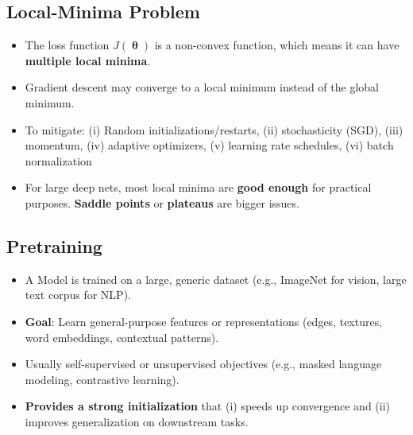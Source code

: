 \subsection*{Local-Minima Problem}
\begin{itemize}
  \item The loss function $J(\boldsymbol{\uptheta})$ is a non-convex function, which means it can have \textbf{multiple local minima}.
  \item Gradient descent may converge to a local minimum instead of the global minimum.
  \item To mitigate: (i) Random initializations/restarts, (ii) stochasticity (SGD), (iii) momentum, (iv) adaptive optimizers, (v) learning rate schedules, (vi) batch normalization
  \item For large deep nets, most local minima are \textbf{good enough} for practical purposes. \textbf{Saddle points} or \textbf{plateaus} are bigger issues.
\end{itemize}

\subsection*{Pretraining}
  \begin{itemize}
    \item A Model is trained on a large, generic dataset (e.g., ImageNet for vision, large text corpus for NLP).  
    \item \textbf{Goal}: Learn general-purpose features or representations (edges, textures, word embeddings, contextual patterns).  
    \item Usually self-supervised or unsupervised objectives (e.g., masked language modeling, contrastive learning).  
    \item \textbf{Provides a strong initialization} that (i) speeds up convergence and (ii) improves generalization on downstream tasks.
  \end{itemize}

